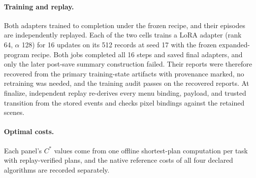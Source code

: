 \paragraph{Training and replay.}
Both adapters trained to completion under the frozen recipe, and their episodes are independently replayed. Each of the two cells trains a LoRA adapter (rank 64, $\alpha$ 128) for 16 updates on its 512 records at seed 17 with the frozen expanded-program recipe. Both jobs completed all 16 steps and saved final adapters, and only the later post-save summary construction failed. Their reports were therefore recovered from the primary training-state artifacts with provenance marked, no retraining was needed, and the training audit passes on the recovered reports. At finalize, independent replay re-derives every menu binding, payload, and trusted transition from the stored events and checks pixel bindings against the retained scenes.

\paragraph{Optimal costs.}
Each panel's $C^*$ values come from one offline shortest-plan computation per task with replay-verified plans, and the native reference costs of all four declared algorithms are recorded separately.
